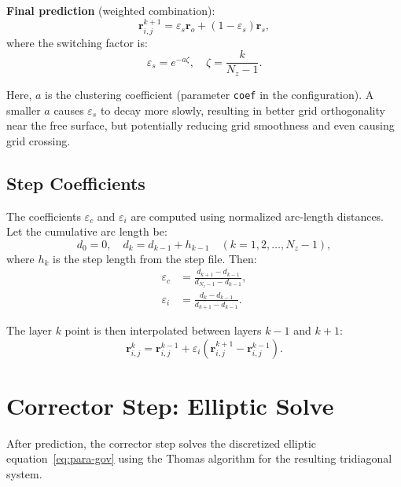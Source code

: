 \documentclass[11pt,a4paper]{report}
\newcommand{\rvec}{\bm{r}}
\begin{document}
\textbf{Final prediction} (weighted combination):
\begin{equation}
    \rvec_{i,j}^{k+1} = \varepsilon_s \rvec_o + (1 - \varepsilon_s) \rvec_s,
    \label{eq:para-predict}
\end{equation}
where the switching factor is:
\begin{equation}
    \varepsilon_s = e^{-a \zeta}, \quad \zeta = \frac{k}{N_z - 1}.
\end{equation}

Here, $a$ is the clustering coefficient (parameter \texttt{coef} in the configuration). A smaller $a$ causes $\varepsilon_s$ to decay more slowly, resulting in better grid orthogonality near the free surface, but potentially reducing grid smoothness and even causing grid crossing.

\subsection{Step Coefficients}

The coefficients $\varepsilon_c$ and $\varepsilon_i$ are computed using normalized arc-length distances. Let the cumulative arc length be:
\begin{equation}
    d_0 = 0, \quad d_k = d_{k-1} + h_{k-1} \quad (k = 1, 2, \ldots, N_z-1),
\end{equation}
where $h_k$ is the step length from the step file. Then:
\begin{equation}
\begin{aligned}
    \varepsilon_c &= \frac{d_{k+1} - d_{k-1}}{d_{N_z-1} - d_{k-1}}, \\
    \varepsilon_i &= \frac{d_k - d_{k-1}}{d_{k+1} - d_{k-1}}.
\end{aligned}
\end{equation}

The layer $k$ point is then interpolated between layers $k-1$ and $k+1$:
\begin{equation}
    \rvec_{i,j}^{k} = \rvec_{i,j}^{k-1} + \varepsilon_i (\rvec_{i,j}^{k+1} - \rvec_{i,j}^{k-1}).
\end{equation}

\section{Corrector Step: Elliptic Solve}

After prediction, the corrector step solves the discretized elliptic equation~\eqref{eq:para-gov} using the Thomas algorithm for the resulting tridiagonal system.
\end{document}
